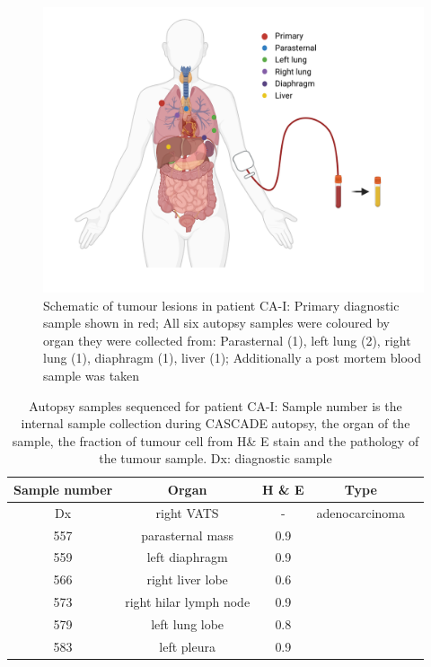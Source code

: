 \begin{figure}[ht]
	\centering
	\includegraphics[width=.99\linewidth]{Figures/CASCADE/CA51/CA-I_schematic_CA51_organColours}
	\caption[Schematic of tumour lesions in patient CA-I]{Schematic of tumour lesions in patient CA-I: Primary diagnostic sample shown in red; All six autopsy samples were coloured by organ they were collected from: Parasternal (1), left lung (2), right lung (1), diaphragm (1), liver (1); Additionally a post mortem blood sample was taken} \label{fig:ca51schematic}
\end{figure}


\begin{table}[ht]
	\caption[Autopsy samples sequenced for patient CA-I]{Autopsy samples sequenced for patient CA-I: Sample number is the internal sample collection during CASCADE autopsy, the organ of the sample, the fraction of tumour cell from H\& E stain and the pathology of the tumour sample. Dx: diagnostic sample} \label{tab:ca51wesSamples}
	\centering
	\begin{tabular}{|c|c|c|c|c|}
	\toprule
	\hline
 	\rowcolor{gray!50}
\textbf{Sample number} & \textbf{Organ} & \textbf{H \& E} & \textbf{Type}\\
	\hline
 Dx & right VATS & - &  adenocarcinoma \\
 557 & parasternal mass & 0.9 & \cellcolor{gray!15} \\
 559 & left diaphragm & 0.9 & \cellcolor{gray!15} \\
 566 & right liver lobe & 0.6 & \cellcolor{gray!15} \\
 573 & right hilar lymph node & 0.9 & \cellcolor{gray!15} \\
 579 & left lung lobe & 0.8 & \cellcolor{gray!15} \\
 583 & left pleura & 0.9 & \cellcolor{gray!15}\multirow{-6}{*}{small cell} \\
 	\hline
	\bottomrule
	\end{tabular}
\end{table} 


